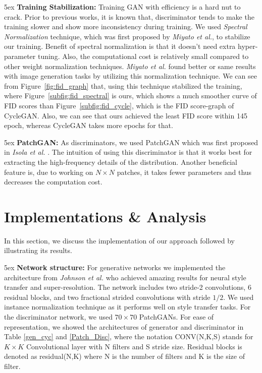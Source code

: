 \documentclass[runningheads]{llncs}
\begin{document}
\parindent 5ex \textbf{Training Stabilization:}
Training GAN with efficiency is a hard nut to crack. Prior to previous works, it is known that, discriminator tends to make the training slower and show more inconsistency during training. We used \textit{Spectral Normalization} technique, which was first proposed by \textit{Miyato et al.}\cite{DBLP:journals/corr/abs-1802-05957}, to stabilize our training. Benefit of spectral normalization is that it doesn't need extra hyper-parameter tuning. Also, the computational cost is relatively small compared to other weight normalization techniques. \textit{Miyato et al.}\cite{DBLP:journals/corr/abs-1802-05957} found better or same results with image generation tasks by utilizing this normalization technique. We can see from Figure~\ref{fig:fid_graph}  that, using this technique stabilized the training, where Figure~\ref{subfig:fid_spectral} is ours, which shows a much smoother curve of FID scores than Figure~\ref{subfig:fid_cycle}, which is the FID score-graph of CycleGAN\cite{DBLP:conf/iccv/ZhuPIE17}. Also, we can see that ours achieved the least FID score within 145 epoch, whereas CycleGAN\cite{DBLP:conf/iccv/ZhuPIE17} takes more epochs for that.


\parindent 5ex \textbf{PatchGAN:}
As discriminators, we used PatchGAN which was first proposed in \textit{Isola et al.} \cite{DBLP:conf/cvpr/2017}. The intuition of using this discriminator is that it works best for extracting the high-frequency details of the distribution. Another beneficial feature is, due to working on $N\times N$ patches, it takes fewer parameters and thus decreases the computation cost.

\section{Implementations \& Analysis} \label{sec:imp}
In this section, we discuss the implementation of our approach followed by illustrating its results.

\parindent 5ex \textbf{Network structure:}
For generative networks we implemented the architecture from \textit{Johnson et al.} \cite{DBLP:journals/corr/JohnsonAL16} who achieved amazing results for neural style transfer and super-resolution. The network includes two stride-2 convolutions, $6$ residual blocks\cite{DBLP:journals/corr/HeZRS15}, and two fractional strided convolutions with stride $1/2$. We used instance normalization technique as it performs well on style transfer tasks. For the discriminator network, we used $70\times70$ PatchGANs\cite{DBLP:conf/cvpr/2017}. For ease of representation, we showed the architectures of generator and discriminator in Table \ref{gen_cyc} and \ref{Patch_Disc}, where the notation CONV(N,K,S) stands for $K \times K$ Convolutional layer with N filters and S stride size. Residual blocks\cite{DBLP:journals/corr/HeZRS15} is denoted as residual(N,K) where N is the number of filters and K is the size of filter. 
\end{document}
